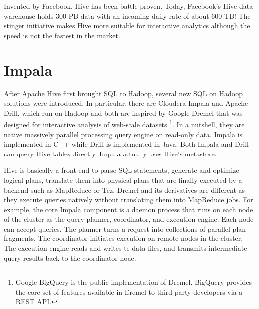 \documentclass[11pt]{book}
\begin{document}
Invented by Facebook, Hive has been battle proven. Today, Facebook's Hive data warehouse holds 300 PB data with an incoming daily rate of about 600 TB! The stinger initiative makes Hive more suitable for interactive analytics although the speed is not the fastest in the market.

\section{Impala}
After Apache Hive first brought SQL to Hadoop, several new SQL on Hadoop solutions were introduced. In particular, there are Cloudera Impala and Apache Drill, which run on Hadoop and both are inspired by Google Dremel that was designed for interactive analysis of web-scale datasets \footnote{Google BigQuery is the public implementation of Dremel. BigQuery provides the core set of features available in Dremel to third party developers via a REST API.}. In a nutshell, they are native massively parallel processing query engine on read-only data. Impala is implemented in C++ while Drill is implemented in Java. Both Impala and Drill can query Hive tables directly. Impala actually uses Hive's metastore.

Hive is basically a front end to parse SQL statements, generate and optimize logical plans, translate them into physical plans that are finally executed by a backend such as MapReduce or Tez. Dremel and its derivatives are different as they execute queries natively without translating them into MapReduce jobs. For example, the core Impala component is a daemon process that runs on each node of the cluster as the query planner, coordinator, and execution engine. Each node can accept queries. The planner turns a request into collections of parallel plan fragments. The coordinator initiates execution on remote nodes in the cluster. The execution engine reads and writes to data files, and transmits intermediate query results back to the coordinator node.
\end{document}
